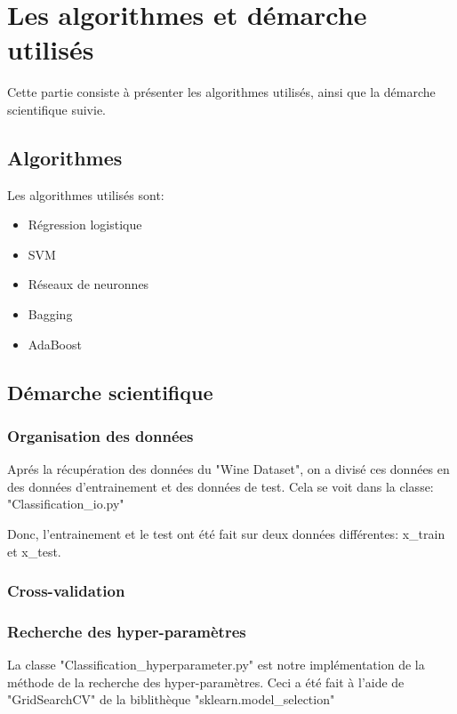 \chapter{Les algorithmes et démarche utilisés}
\par Cette partie consiste à présenter les algorithmes utilisés, ainsi que la démarche scientifique suivie.
\section{Algorithmes}
Les algorithmes utilisés sont:
\begin{itemize}[label=\textbullet]
\item Régression logistique
\item SVM
\item Réseaux de neuronnes
\item Bagging
\item AdaBoost
\end{itemize}

\section{Démarche scientifique}
\subsection{Organisation des données}
\par Aprés la récupération des données du "Wine Dataset", on a divisé ces données en des données d'entrainement et des données de test. Cela se voit dans la classe: "Classification\_io.py"
\par Donc, l'entrainement et le test ont été fait sur deux données différentes: x\_train et x\_test.
\subsection{Cross-validation}

\subsection{Recherche des hyper-paramètres}
\par La classe "Classification\_hyperparameter.py" est notre implémentation de la méthode de la recherche des hyper-paramètres. Ceci a été fait à l'aide de "GridSearchCV" de la biblithèque "sklearn.model\_selection"



